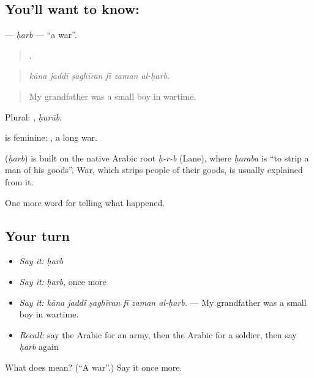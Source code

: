 \subsection*{You'll want to know: }
\textbf{} — \emph{ḥarb} — \textquotedblleft{}a war\textquotedblright{}.

\begin{quote}
     .
\end{quote}

\begin{quote}
\emph{kāna jaddī ṣaghīran fī zaman al-ḥarb.}
\end{quote}

\begin{quote}
My grandfather was a small boy in wartime.
\end{quote}

Plural: , \emph{ḥurūb}.

 is feminine:  , a long war.

\begin{cousinweb}
\textbf{} (\emph{ḥarb}) is built on the native Arabic root \emph{ḥ-r-b} (Lane), where \emph{ḥaraba} is \textquotedblleft{}to strip a man of his goods\textquotedblright{}. War, which strips people of their goods, is usually explained from it.
\end{cousinweb}

\begin{grammarlens}[title={What you've built}]
One more word for telling what happened.
\end{grammarlens}

\subsection*{Your turn}
\begin{itemize}
\raggedright
  \item \emph{Say it:} \emph{ḥarb}
  \item \emph{Say it:} \emph{ḥarb}, once more
  \item \emph{Say it:} \emph{kāna jaddī ṣaghīran fī zaman al-ḥarb.} — My grandfather was a small boy in wartime.
  \item \emph{Recall:} say the Arabic for an army, then the Arabic for a soldier, then say \emph{ḥarb} again
\end{itemize}

\begin{tcolorbox}[breakable,colback=teal!4,colframe=teal!35!black,title={Before you move on}]
What does  mean? (\textquotedblleft{}A war\textquotedblright{}.) Say it once more.
\end{tcolorbox}
